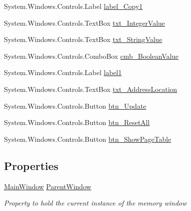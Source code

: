 \begin{DoxyCompactItemize}
\item 
System.\+Windows.\+Controls.\+Label \hyperlink{class_c_p_u___o_s___simulator_1_1_memory_window_a0f501c04b3319ae43e681335e50eeba4}{label\+\_\+\+Copy1}
\item 
System.\+Windows.\+Controls.\+Text\+Box \hyperlink{class_c_p_u___o_s___simulator_1_1_memory_window_af1ad9478de6dac0b4476c51b42849ecf}{txt\+\_\+\+Integer\+Value}
\item 
System.\+Windows.\+Controls.\+Text\+Box \hyperlink{class_c_p_u___o_s___simulator_1_1_memory_window_aca8e57432af036b698d0eeaaa765c483}{txt\+\_\+\+String\+Value}
\item 
System.\+Windows.\+Controls.\+Combo\+Box \hyperlink{class_c_p_u___o_s___simulator_1_1_memory_window_a2a1da5df6a425ce20c7b639fa66c58f2}{cmb\+\_\+\+Boolean\+Value}
\item 
System.\+Windows.\+Controls.\+Label \hyperlink{class_c_p_u___o_s___simulator_1_1_memory_window_ae35c7d3110d7cf96493d6fa68274e858}{label1}
\item 
System.\+Windows.\+Controls.\+Text\+Box \hyperlink{class_c_p_u___o_s___simulator_1_1_memory_window_a3f766ac6c531af3b14248819947d9023}{txt\+\_\+\+Address\+Location}
\item 
System.\+Windows.\+Controls.\+Button \hyperlink{class_c_p_u___o_s___simulator_1_1_memory_window_a9274df08bf008c43b325e50d6db6067f}{btn\+\_\+\+Update}
\item 
System.\+Windows.\+Controls.\+Button \hyperlink{class_c_p_u___o_s___simulator_1_1_memory_window_aeeefcad9b4510fd7fd5899f3a2db4786}{btn\+\_\+\+Reset\+All}
\item 
System.\+Windows.\+Controls.\+Button \hyperlink{class_c_p_u___o_s___simulator_1_1_memory_window_a62372edf818561f1584160d41c2f67f7}{btn\+\_\+\+Show\+Page\+Table}
\end{DoxyCompactItemize}
\subsection*{Properties}
\begin{DoxyCompactItemize}
\item 
\hyperlink{class_c_p_u___o_s___simulator_1_1_main_window}{Main\+Window} \hyperlink{class_c_p_u___o_s___simulator_1_1_memory_window_ad61b6543a424be98fd0a4e0fa732f3d4}{Parent\+Window}
\begin{DoxyCompactList}\small\item\em Property to hold the current instance of the memory window \end{DoxyCompactList}\end{DoxyCompactItemize}
